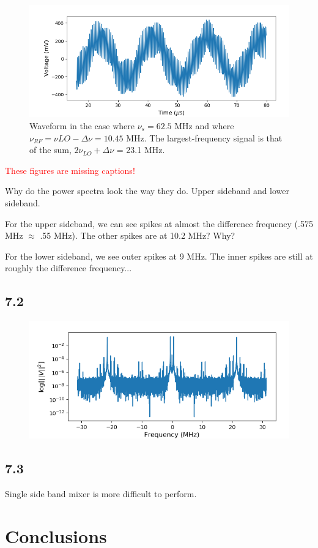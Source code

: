 \documentclass[a4paper]{article}
\begin{document}
\begin{figure}
\centering
\includegraphics[width=.8\linewidth]{7-1/low_osc}
\caption{Waveform in the case where $\nu_s = 62.5$ MHz and where $\nu_{RF} = \nu{LO} - \Delta \nu = 10.45$ MHz. The largest-frequency signal is that of the sum, $2 \nu_{LO} + \Delta \nu$ = 23.1 MHz.}
\label{fig:low_display}
\end{figure}

\textcolor{red}{These figures are missing captions!}

Why do the power spectra look the way they do. Upper sideband and lower sideband.

For the upper sideband, we can see spikes at almost the difference frequency (.575 MHz $\approx$ .55 MHz). The other spikes are at 10.2 MHz? Why?

For the lower sideband, we see outer spikes at 9 MHz. The inner spikes are still at roughly the difference frequency...

\subsection{7.2}

\begin{figure}
\centering
\includegraphics[width=.8\linewidth]{7-2}
\caption{}
\label{fig:intermods}
\end{figure}

\subsection{7.3}


Single side band mixer is more difficult to perform.

\section{Conclusions}



\end{document}
